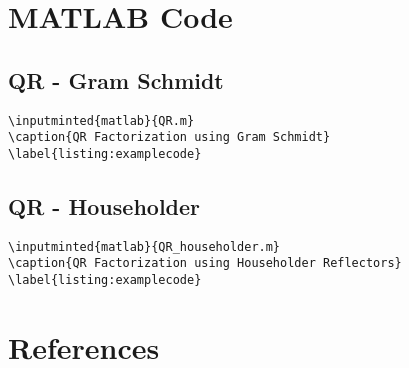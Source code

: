 \documentclass{article}
\begin{document}
\newpage
\section{MATLAB Code}
\subsection{QR - Gram Schmidt}
\begin{lstlisting}[h]
\inputminted{matlab}{QR.m}
\caption{QR Factorization using Gram Schmidt}
\label{listing:examplecode}
\end{lstlisting}

\newpage
\subsection{QR - Householder}
\begin{lstlisting}[h]
\inputminted{matlab}{QR_householder.m}
\caption{QR Factorization using Householder Reflectors}
\label{listing:examplecode}
\end{lstlisting}

\section{References}

\printbibliography
\end{document}
